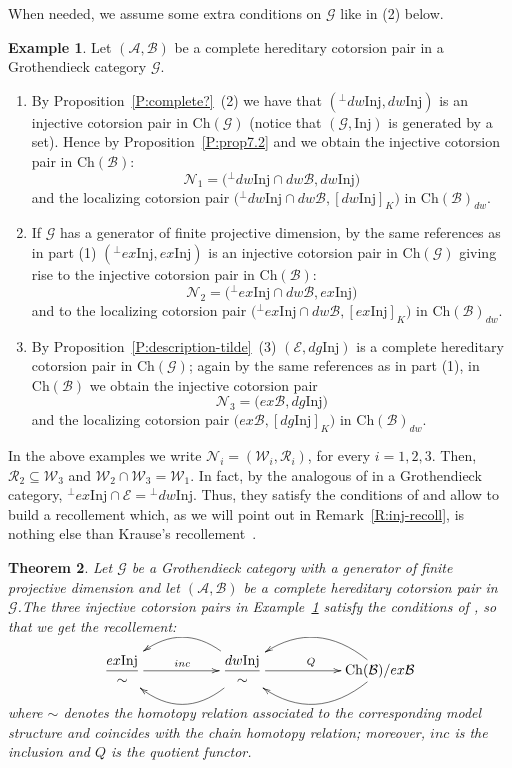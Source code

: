 \documentclass[11pt,a4paper,reqno]{amsart}
\newcommand{\A}{\mathcal{A}}
\newcommand{\B}{\mathcal{B}}
\newcommand{\E}{\mathcal{E}}
\newcommand{\G}{\mathcal{G}}
\newcommand{\N}{\mathcal{N}}
\newcommand{\R}{\mathcal{R}}
\newcommand{\W}{\mathcal{W}}
\newcommand{\Ch}{\mathrm{Ch}}
\newcommand{\Inj}{\mathrm{Inj}}
\theoremstyle{plain}
\newtheorem{thm}{Theorem}[section]
\theoremstyle{definition}
\newtheorem{expl}[thm]{Example}
\theoremstyle{remark}
\begin{document}
When needed, we assume some extra conditions on $\G$ like in (2) below.
 \begin{expl}\label{E:examples-inj} Let $(\A, \B)$ be a complete hereditary cotorsion pair in a Grothendieck  category $\G$.
 \begin{enumerate}
\item  By Proposition~\ref{P:complete?}~(2) we have that $({}^\perp{} dw \Inj, dw \Inj)$ is an injective cotorsion pair  in $\Ch(\G)$ (notice that $(\G, \Inj)$ is generated by a set).
 Hence by Proposition~\ref{P:prop7.2} and \cite[Theorem 6.3]{G7} we obtain the injective cotorsion pair in $\Ch(\B)$:
  \[\N_1=\Big({}^\perp{} dw \Inj\cap dw \B, dw \Inj\Big)\] and the localizing cotorsion pair $\Big({}^\perp{} dw \Inj\cap dw \B, [dw \Inj]_K\Big)$ in $\Ch(\B)_{dw}.$
 \item If $\G$ has a generator of finite projective dimension, by the same references as in part (1) $({}^\perp{} ex \Inj, ex \Inj)$ is an injective cotorsion pair  in $\Ch(\G)$ giving rise to the injective cotorsion pair in $\Ch(\B)$:
 \[\N_2=\Big({}^\perp{} ex \Inj\cap dw \B, ex \Inj\Big)\] and to the localizing cotorsion pair $\Big({}^\perp{} ex \Inj\cap dw \B, [ex \Inj]_K\Big)$ in $\Ch(\B)_{dw}.$
 \item  By Proposition~\ref{P:description-tilde}~(3) $(\E, dg\Inj)$ is a complete hereditary cotorsion pair in $\Ch(\G)$; again by the same references as in part (1), in  $\Ch(\B)$ we obtain the injective cotorsion pair
 \[\N_3=\Big(ex\B,dg \Inj\Big)\] and the localizing cotorsion pair $\Big(ex\B, [dg \Inj]_K\Big)$ in $\Ch(\B)_{dw}.$

\end{enumerate}
\end{expl}

 In the above examples we  write $\N_i=(\W_i, \R_i)$, for every $i=1,2,3$. Then, $\R_2\subseteq \W_3$ and
$\W_2\cap\W_3=\W_1$. In fact, by the analogous of \cite[Theorem 4.7]{G4} in a Grothendieck category,  ${}^\perp{} ex \Inj\cap \E={}^\perp{} dw\Inj$. Thus, they satisfy the conditions of  \cite[Theorem 3.4]{G7} and allow to build a recollement which, as we will point out in Remark~\ref{R:inj-recoll}, is nothing else than Krause's recollement~\cite{Kr05}.
%

\begin{thm}\label{T:recollement-inj} Let $\G$ be a Grothendieck category with a generator of finite projective dimension and let $(\A, \B)$ be a complete hereditary cotorsion pair in $\G$.The three injective cotorsion pairs in Example~\ref{E:examples-inj} satisfy the conditions of \cite[Theorem 3.4]{G7}, so that we get the recollement:


%
%
%
%
%
%
%
\[
\xymatrix{\dfrac{ex \Inj}{\sim} \ar[rr]^{inc} &&\dfrac{dw\Inj}{\sim} \ar@/^2pc/
[ll]\ar@/_2pc/[ll] \ar[rr]^{Q}
&&{\Ch(\B)/ex\B}\ar@/^2pc/ [ll] \ar@/_2pc/ [ll] }
\]
\vskip 0.7cm

where $\sim$ denotes the homotopy relation associated to the corresponding model structure and coincides with the chain homotopy relation; moreover, $inc$ is the inclusion and $Q$ is the quotient functor.
%
\end{thm}
\end{document}
